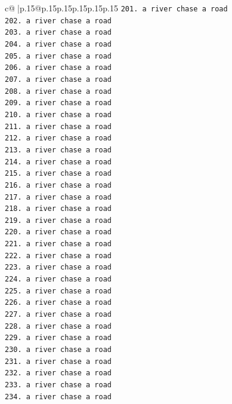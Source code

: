 \documentclass{article}
\begin{document}
{\begin{supertabular}{c@{$\;$}|p{.15\linewidth}@{}p{.15\linewidth}p{.15\linewidth}p{.15\linewidth}p{.15\linewidth}p{.15\linewidth}}
{{{\texttt{201. a river chase a road} \\
\texttt{202. a river chase a road} \\
\texttt{203. a river chase a road} \\
\texttt{204. a river chase a road} \\
\texttt{205. a river chase a road} \\
\texttt{206. a river chase a road} \\
\texttt{207. a river chase a road} \\
\texttt{208. a river chase a road} \\
\texttt{209. a river chase a road} \\
\texttt{210. a river chase a road} \\
\texttt{211. a river chase a road} \\
\texttt{212. a river chase a road} \\
\texttt{213. a river chase a road} \\
\texttt{214. a river chase a road} \\
\texttt{215. a river chase a road} \\
\texttt{216. a river chase a road} \\
\texttt{217. a river chase a road} \\
\texttt{218. a river chase a road} \\
\texttt{219. a river chase a road} \\
\texttt{220. a river chase a road} \\
\texttt{221. a river chase a road} \\
\texttt{222. a river chase a road} \\
\texttt{223. a river chase a road} \\
\texttt{224. a river chase a road} \\
\texttt{225. a river chase a road} \\
\texttt{226. a river chase a road} \\
\texttt{227. a river chase a road} \\
\texttt{228. a river chase a road} \\
\texttt{229. a river chase a road} \\
\texttt{230. a river chase a road} \\
\texttt{231. a river chase a road} \\
\texttt{232. a river chase a road} \\
\texttt{233. a river chase a road} \\
\texttt{234. a river chase a road} \\
}}}
\end{supertabular}}
\end{document}
